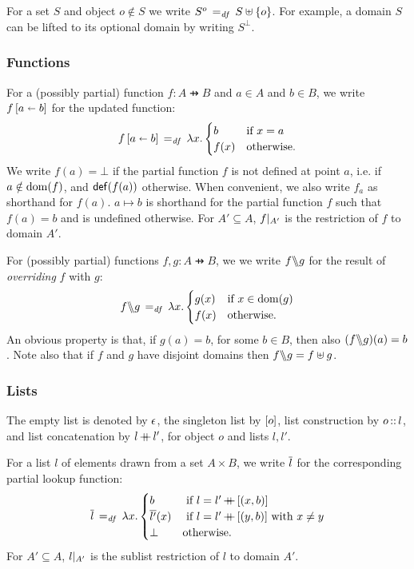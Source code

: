 \documentclass[11pt]{article}
\begin{document}
For a set $S$ and object $o \notin S$ we write $S^o \operatorname{\;=_{\mathit{df}}\;} S \uplus \left\lbrace o \right\rbrace$. For example, a domain $S$ can be lifted to its optional domain by writing $S^\bot$. 

\subsubsection{Functions}
\label{sec:functions}

For a (possibly partial) function $f : A \pfun B$ and $a \in A$ and $b \in B$, we write $f \left[ a \shortleftarrow b \right]$ for the updated function: \[ f \left[ a \shortleftarrow b \right] \operatorname{\;=_{\mathit{df}}\;} \lambda x . \begin{cases}
	b & \text{if $x = a$} \\
	f(x) & \text{otherwise.}
\end{cases}\] We write $f(a) = \bot$ if the partial function $f$ is not defined at point $a$, i.e. if $a \notin \operatorname{\mathrm{dom}}(f)$, and $\mathsf{def}(f(a))$ otherwise. When convenient, we also write $f_a$ as shorthand for $f(a)$. $a \mapsto b$ is shorthand for the partial function $f$ such that $f(a) = b$ and is undefined otherwise. For $A' \subseteq A$, $f |_{A'}$ is the restriction of $f$ to domain $A'$. 

For (possibly partial) functions $f,g : A \pfun B$, we we write $f \backslash\!\!\backslash g$ for the result of \emph{overriding} $f$ with $g$: \[ f \backslash\!\!\backslash g \operatorname{\;=_{\mathit{df}}\;} \lambda x . \begin{cases}
	g(x) & \text{if $x \in \operatorname{\mathrm{dom}}(g)$} \\
	f(x) & \text{otherwise.}
\end{cases} \] An obvious property is that, if $g(a) = b$, for some $b \in B$, then also $(f \backslash\!\!\backslash g)(a) = b$. Note also that if $f$ and $g$ have disjoint domains then $f \backslash\!\!\backslash g = f \uplus g$. 

\subsubsection{Lists}
\label{sec:lists}

The empty list is denoted by $\epsilon$, the singleton list by $\left[o\right]$, list construction by $o \operatorname{:\!:} l$, and list concatenation by $l \operatorname{+\!\!\!+} l'$, for object $o$ and lists $l,l'$. 

For a list $l$ of elements drawn from a set $A \times B$, we write $\overline{l}$ for the corresponding partial lookup function: \[ \overline{l} \operatorname{\;=_{\mathit{df}}\;} \lambda x .\begin{cases}
	b &\text{ if $l = l' \operatorname{+\!\!\!+} \left[(x,b)\right]$}\\
	\overline{l'}(x) &\text{ if $l = l' \operatorname{+\!\!\!+} \left[(y,b)\right]$ with $x \neq y$}\\
	\bot & \text{otherwise.}
\end{cases}\] For $A' \subseteq A$, $l |_{A'}$ is the sublist restriction of $l$ to domain $A'$.
\end{document}
